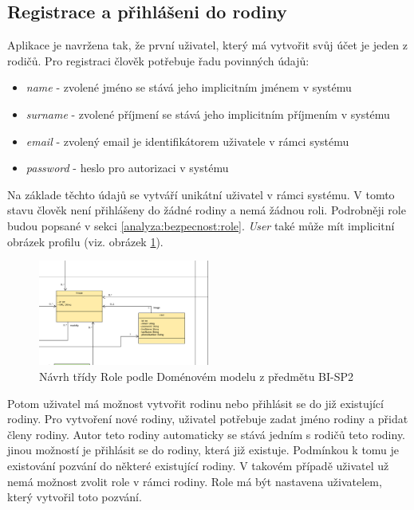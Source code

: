     \subsection{Registrace a přihlášeni do rodiny}
        Aplikace je navržena tak, že první uživatel, který má vytvořit svůj účet je jeden z rodičů. Pro registraci člověk potřebuje řadu povinných údajů:
        \begin{itemize}
	        \item \textit{name} - zvolené jméno se stává jeho implicitním jménem v systému
	        \item \textit{surname} - zvolené příjmení se stává jeho implicitním příjmením v systému
	        \item \textit{email} - zvolený email je identifikátorem uživatele v rámci systému
	        \item \textit{password} - heslo pro autorizaci v systému
        \end{itemize}
        Na základe těchto údajů se vytváří unikátní uživatel v rámci systému. V tomto stavu člověk není přihlášeny do žádné rodiny a nemá žádnou roli. Podrobněji role budou popsané v sekci \ref{analyza:bezpecnost:role}. \textit{User} také může mít implicitní obrázek profilu (viz. obrázek \ref{image:User-Image1}).
        \begin{figure}\centering
	        \includegraphics[width=0.5\textwidth]{pdfs/User-Image1}
	        \caption[Návrh Rolí]{Návrh třídy Role podle Doménovém modelu z předmětu BI-SP2}\label{image:User-Image1}
        \end{figure}
        
        Potom uživatel má možnost vytvořit rodinu nebo přihlásit se do již existující rodiny. Pro vytvoření nové rodiny, uživatel potřebuje zadat jméno rodiny a přidat členy rodiny. Autor teto rodiny automaticky se stává jedním s rodičů teto rodiny. jinou možností je přihlásit se do rodiny, která již existuje. Podmínkou k tomu je existování pozvání do některé existující rodiny. V takovém případě uživatel už nemá možnost zvolit role v rámci rodiny. Role má být nastavena uživatelem, který vytvořil toto pozvání.

